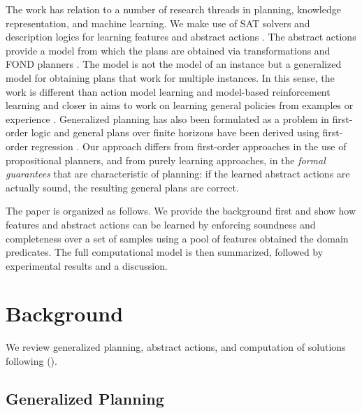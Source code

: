 \documentclass[letterpaper]{article} %
\newcommand{\citeay}[1]{\citeauthor{#1} (\citeyear{#1})}
\begin{document}
The work has relation to a number of research threads in planning, knowledge
representation, and machine learning. We make use of SAT solvers and description
logics for learning features and abstract actions \cite{sat-handbook,dl-handbook}.
The abstract actions provide a model from which the plans are obtained via
transformations and FOND planners \cite{geffner:book,ghallab:book}.
The model is not the model of an instance but a generalized model for obtaining
plans that work for multiple instances. In this sense, the work is different than
action model learning \cite{yang:action-learning} and model-based reinforcement
learning and closer in aims to work on learning general policies from examples or
experience \cite{martin:concept,fern:bias,mazebase,general-drl}.
Generalized planning has also been formulated as a problem in first-order logic
\cite{srivastava:generalized} and general plans over finite horizons have been
derived using first-order regression \cite{boutilier2001symbolic,wang2008first,van2012solving}.
Our approach differs from first-order approaches in the use of propositional
planners, and from purely learning approaches, in the \emph{formal guarantees} that
are characteristic of planning: if the learned abstract actions are actually sound,
the resulting general plans are correct. 

The paper is organized as follows. We provide the background first and show
how features and abstract actions can be learned by enforcing soundness and
completeness over a set of samples using a pool of features obtained the
domain predicates. The full computational model is then summarized, followed
by experimental results and a discussion.


\section{Background}

We review generalized planning, abstract actions, and computation of solutions 
following  \citeay{bonet:ijcai2018}.


\subsection{Generalized Planning}
\end{document}
